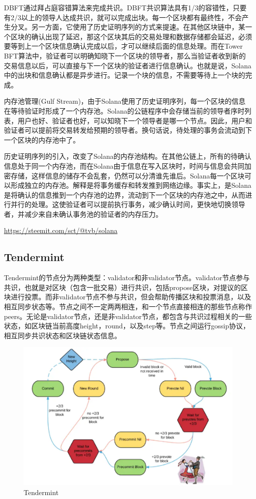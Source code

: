 \documentclass[a4paper,twoside]{scrbook}
\begin{document}
\begin{CJK}{UTF8}{gbsn}
DBFT通过拜占庭容错算法来完成共识。DBFT共识算法具有1/3的容错性，只要有2/3以上的领导人达成共识，就可以完成出块。每一个区块都有最终性，不会产生分叉。另一方面，它使用了历史证明序列的方式来提速。在其他区块链中，某一个区块的确认出现了延迟，那这个区块其后的交易处理和数据存储都会延迟，必须要等到上一个区块信息确认完成以后，才可以继续后面的信息处理。而在Tower BFT算法中，验证者可以明确知晓下一个区块的领导者，那么当验证者收到新的交易信息以后，可以直接与下一个区块的验证者进行信息确认。也就是说，Solana中的出块和信息确认都是异步进行。记录一个块的信息，不需要等待上一个块的完成。

内存池管理(Gulf Stream)，由于Solana使用了历史证明序列，每一个区块的信息在等待验证时形成了一个内存池。Solana的公链程序中会存储当前的领导者序时列表，用户也好、验证者也好，可以知晓下一个领导者是哪一个节点。因此，用户和验证者可以提前将交易转发给预期的领导者。换句话说，待处理的事务会流动到下一个区块的内存池中了。

历史证明序列的引入，改变了Solana的内存池结构。在其他公链上，所有的待确认信息处于同一个内存池，而在Solana由于信息在写入区块时，时间与信息会共同加密存储，这样信息的储存不会乱套，仍然可以分清谁先谁后。Solana每一个区块可以形成独立的内存池。解释是将事务缓存和转发推到网络边缘。事实上，是Solana是将确认的信息推到一个内存池的边界，流动到下一个区块的内存池之中，从而进行并行的处理。这使验证者可以提前执行事务，减少确认时间，更快地切换领导者，并减少来自未确认事务池的验证者的内存压力。

\url{https://steemit.com/sct/@tvb/solana}

\subsection{Tendermint}
Tendermint的节点分为两种类型：validator和非validator节点。validator节点参与共识，也就是对区块（包含一批交易）进行共识，包括propose区块，对提议的区块进行投票。而非validator节点不参与共识，但会帮助传播区块和投票消息，以及相互同步状态等。节点之间不一定两两相连，和一个节点直接相连的那些节点称作peers。无论是validator节点，还是非validator节点，都包含与共识过程相关的一些状态，如区块链当前高度height，round，以及step等。节点之间运行gossip协议，相互同步共识状态和区块链状态信息。

\begin{figure}[!htbp]
\centering
\includegraphics[width=1\textwidth]{Figures/Tendermint.png}
\caption{Tendermint} 
\label{fig:Tendermint}
\end{figure}


\end{CJK}
\end{document}
